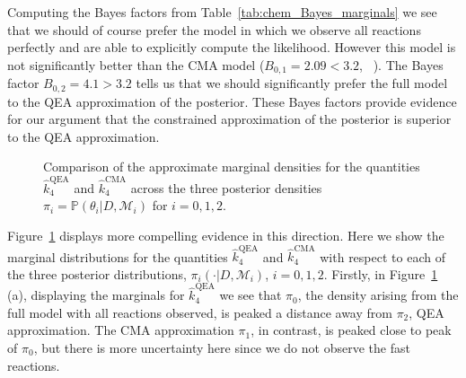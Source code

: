 \documentclass[final]{siamltex}
\newcommand{\edit}[1]{{\color{red} #1}}
\begin{document}
Computing the Bayes factors from Table~\ref{tab:chem_Bayes_marginals}
we see that we should of course prefer the model \edit{ in
which we observe all reactions perfectly and are able to explicitly
compute the likelihood}. However this model is not
significantly better than the CMA model ($B_{0,1} = 2.09 < 3.2$,
~\cite{kass1995bayes}). The Bayes factor $B_{0,2} = 4.1 > 3.2$ tells
us that we should significantly prefer the full model to the QEA
approximation of the posterior. These Bayes factors provide evidence
for our
argument that the constrained approximation of the posterior is
superior to the QEA approximation. 

\begin{figure}[!htb]
\centering
{}
\caption{Comparison of the approximate marginal densities for the
  quantities $\hat{k}_4^{\text{QEA}}$ and $\hat{k}_4^{\text{CMA}}$
  across the three posterior densities $\pi_i = \mathbb{P}(\theta_i|D,\mathcal{M}_i)$ for $i = 0, 1, 2$.}
\label{fig:chem_model_comp}
\end{figure}

Figure~\ref{fig:chem_model_comp} displays more compelling evidence in
this direction. Here we show the marginal distributions for the
quantities $\hat{k}_4^{\text{QEA}}$ and $\hat{k}_4^{\text{CMA}}$ with
respect to each of the three posterior distributions, $\pi_i(\cdot|D,
\mathcal{M}_i)$, $i = 0, 1, 2$. Firstly, in
Figure~\ref{fig:chem_model_comp} (a), displaying the marginals for
$\hat{k}_4^{\text{QEA}}$ we see that $\pi_0$, the density arising from
the full model with all reactions observed, is peaked a distance away
from $\pi_2$, QEA approximation. The CMA approximation $\pi_1$, in contrast, is
peaked close to peak of $\pi_0$, but there is more uncertainty here
since we do not observe the fast reactions.
\end{document}
